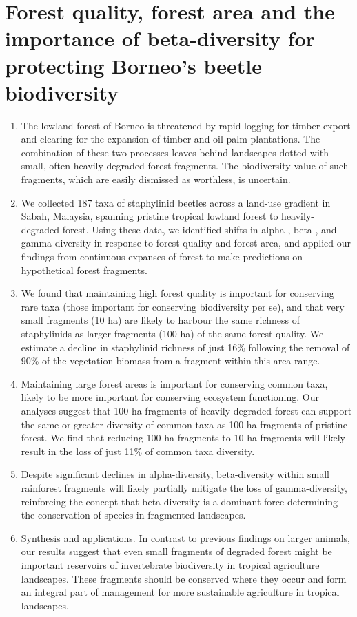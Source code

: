 \section*{Forest quality, forest area and the importance of beta-diversity for protecting Borneo's beetle biodiversity \citep{Sharp}}

\begin{enumerate}
	\item The lowland forest of Borneo is threatened by rapid logging for timber export and clearing for the expansion of timber and oil palm plantations. The combination of these two processes leaves behind landscapes dotted with small, often heavily degraded forest fragments. The biodiversity value of such fragments, which are easily dismissed as worthless, is uncertain.
	\item We collected 187 taxa of staphylinid beetles across a land-use gradient in Sabah, Malaysia, spanning pristine tropical lowland forest to heavily-degraded forest. Using these data, we identified shifts in alpha-, beta-, and gamma-diversity in response to forest quality and forest area, and applied our findings from continuous expanses of forest to make predictions on hypothetical forest fragments.
	\item We found that maintaining high forest quality is important for conserving rare taxa (those important for conserving biodiversity per se), and that very small fragments (10 ha) are likely to harbour the same richness of staphylinids as larger fragments (100 ha) of the same forest quality. We estimate a decline in staphylinid richness of just 16\% following the removal of 90\% of the vegetation biomass from a fragment within this area range.
	\item Maintaining large forest areas is important for conserving common taxa, likely to be more important for conserving ecosystem functioning. Our analyses suggest that 100 ha fragments of heavily-degraded forest can support the same or greater diversity of common taxa as 100 ha fragments of pristine forest. We find that reducing 100 ha fragments to 10 ha fragments will likely result in the loss of just 11\% of common taxa diversity.
	\item Despite significant declines in alpha-diversity, beta-diversity within small rainforest fragments will likely partially mitigate the loss of gamma-diversity, reinforcing the concept that beta-diversity is a dominant force determining the conservation of species in fragmented landscapes.
	\item Synthesis and applications. In contrast to previous findings on larger animals, our results suggest that even small fragments of degraded forest might be important reservoirs of invertebrate biodiversity in tropical agriculture landscapes. These fragments should be conserved where they occur and form an integral part of management for more sustainable agriculture in tropical landscapes.
\end{enumerate}


